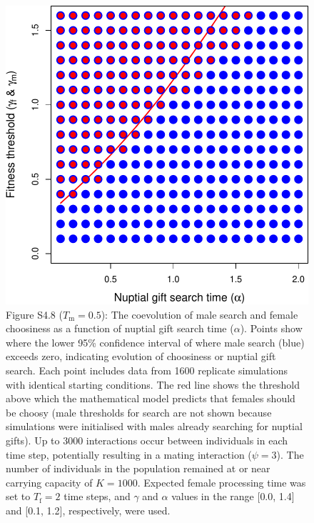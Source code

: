 \documentclass[
]{article}
\begin{document}
\begin{figure}
\centering
\includegraphics{ms_refs_fixed_files/figure-latex/unnamed-chunk-13-1.pdf}
\caption{Figure S4.8 (\(T_{\mathrm{m}} = 0.5\)): The coevolution of male
search and female choosiness as a function of nuptial gift search time
(\(\alpha\)). Points show where the lower 95\% confidence interval of
where male search (blue) exceeds zero, indicating evolution of
choosiness or nuptial gift search. Each point includes data from 1600
replicate simulations with identical starting conditions. The red line
shows the threshold above which the mathematical model predicts that
females should be choosy (male thresholds for search are not shown
because simulations were initialised with males already searching for
nuptial gifts). Up to 3000 interactions occur between individuals in
each time step, potentially resulting in a mating interaction
(\(\psi = 3\)). The number of individuals in the population remained at
or near carrying capacity of \(K = 1000\). Expected female processing
time was set to \(T_{\mathrm{f}}=2\) time steps, and \(\gamma\) and
\(\alpha\) values in the range {[}0.0, 1.4{]} and {[}0.1, 1.2{]},
respectively, were used.}
\end{figure}

\captionsetup{labelformat=default}

\clearpage
\end{document}
